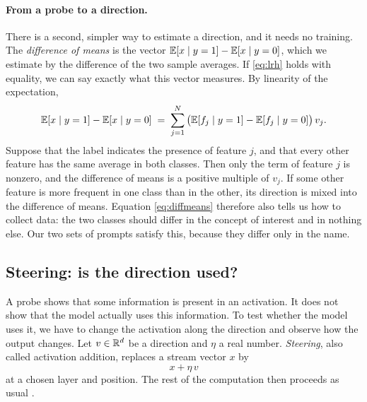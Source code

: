 \paragraph{From a probe to a direction.} There is a second, simpler way to estimate a direction, and it needs no
training. The \emph{difference of means} is the vector $\mathbb{E}[x\mid y=1]-\mathbb{E}[x\mid y=0]$, which we estimate by the
difference of the two sample averages. If \eqref{eq:lrh} holds with equality, we can say exactly what this vector
measures. By linearity of the expectation,
\begin{equation}\label{eq:diffmeans}
\mathbb{E}[x\mid y=1]-\mathbb{E}[x\mid y=0] \;=\; \sum_{j=1}^{N}\big(\mathbb{E}[f_j\mid y=1]-\mathbb{E}[f_j\mid y=0]\big)\,v_j .
\end{equation}
Suppose that the label indicates the presence of feature $j$, and that every other feature has the same average
in both classes. Then only the term of feature $j$ is nonzero, and the difference of means is a positive multiple of
$v_j$. If some other feature is more frequent in one class than in the other, its direction is mixed into the
difference of means. Equation \eqref{eq:diffmeans} therefore also tells us how to collect data: the two classes
should differ in the concept of interest and in nothing else. Our two sets of prompts satisfy this, because they
differ only in the name.

\subsection{Steering: is the direction used?}

A probe shows that some information is present in an activation. It does not show that the model actually uses
this information. To test whether the model uses it, we have to change the activation along the direction and
observe how the output changes. Let $v\in\mathbb{R}^d$ be a direction and $\eta$ a real number. \emph{Steering}, also
called activation addition, replaces a stream vector $x$ by
\begin{equation}\label{eq:actadd}
x+\eta\,v
\end{equation}
at a chosen layer and position. The rest of the computation then proceeds as usual
\citep{turner2023steering,rimsky2024steering}.

